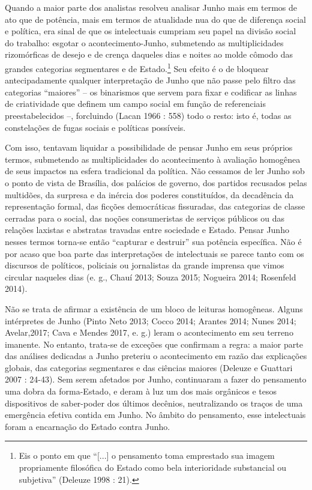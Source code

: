 Quando a maior parte dos analistas
resolveu analisar Junho mais em termos de ato que de potência, mais em
termos de atualidade nua do que de diferença social e política, era
sinal de que os intelectuais cumpriam seu papel na divisão social do
trabalho: esgotar o acontecimento-Junho, submetendo as multiplicidades
rizomórficas de desejo e de crença daqueles dias e noites ao molde
cômodo das grandes categorias segmentares e de Estado.\footnote{Eis o
  ponto em que ``{[}...{]} o pensamento toma emprestado sua imagem
  propriamente filosófica do Estado como bela interioridade substancial
  ou subjetiva'' (Deleuze 1998 : 21).} Seu efeito é o de bloquear
antecipadamente qualquer interpretação de Junho que não passe pelo
filtro das categorias ``maiores'' -- os binarismos que servem para fixar
e codificar as linhas de criatividade que definem um campo social em
função de referenciais preestabelecidos --, forcluindo (Lacan 1966 :
558) todo o resto: isto é, todas as constelações de fugas sociais e
políticas possíveis.

Com isso, tentavam liquidar a possibilidade de pensar Junho em seus
próprios termos, submetendo as multiplicidades do acontecimento à
avaliação homogênea de seus impactos na esfera tradicional da política.
Não cessamos de ler Junho sob o ponto de vista de Brasília, dos palácios
de governo, dos partidos recusados pelas multidões, da surpresa e da
inércia dos poderes constituídos, da decadência da representação formal,
das ficções democráticas fissuradas, das categorias de classe cerradas
para o social, das noções consumeristas de serviços públicos ou das
relações laxistas e abstratas travadas entre sociedade e Estado. Pensar
Junho nesses termos torna-se então ``capturar e destruir'' sua potência
específica. Não é por acaso que boa parte das interpretações de
intelectuais se parece tanto com os discursos de políticos, policiais ou
jornalistas da grande imprensa que vimos circular naqueles dias (e. g.,
Chauí 2013; Souza 2015; Nogueira 2014; Rosenfeld 2014).

Não se trata de afirmar a existência de um bloco de leituras homogêneas.
Alguns intérpretes de Junho (Pinto Neto 2013; Cocco 2014; Arantes 2014;
Nunes 2014; Avelar,2017; Cava e Mendes 2017, e. g.) leram o
acontecimento em seu terreno imanente. No entanto, trata-se de exceções
que confirmam a regra: a maior parte das análises dedicadas a Junho
preteriu o acontecimento em razão das explicações globais, das
categorias segmentares e das ciências maiores (Deleuze e Guattari 2007 :
24-43). Sem serem afetados por Junho, continuaram a fazer do pensamento
uma dobra da forma-Estado, e deram à luz um dos mais orgânicos e tesos
dispositivos de saber-poder dos últimos decênios, neutralizando os
traços de uma emergência efetiva contida em Junho. No âmbito do
pensamento, esse intelectuais foram a encarnação do Estado contra Junho.

